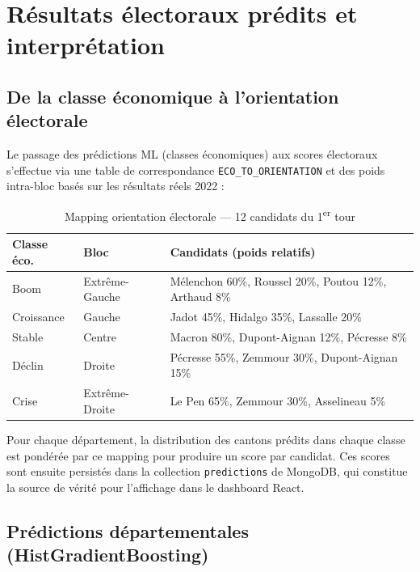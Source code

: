 \chapter{Résultats électoraux prédits et interprétation}
\label{ch:resultats}

\section{De la classe économique à l'orientation électorale}

Le passage des prédictions ML (classes économiques) aux scores électoraux s'effectue
via une table de correspondance \texttt{ECO\_TO\_ORIENTATION} et des poids intra-bloc
basés sur les résultats réels 2022 :

\begin{table}[H]
\centering
\caption{Mapping orientation électorale — 12 candidats du 1\textsuperscript{er} tour}
\label{tab:mapping}
\begin{tabular}{llp{7cm}}
\toprule
\textbf{Classe éco.} & \textbf{Bloc} & \textbf{Candidats (poids relatifs)} \\
\midrule
Boom       & Extrême-Gauche & Mélenchon 60\%, Roussel 20\%, Poutou 12\%, Arthaud 8\% \\
Croissance & Gauche         & Jadot 45\%, Hidalgo 35\%, Lassalle 20\% \\
Stable     & Centre         & Macron 80\%, Dupont-Aignan 12\%, Pécresse 8\% \\
Déclin     & Droite         & Pécresse 55\%, Zemmour 30\%, Dupont-Aignan 15\% \\
Crise      & Extrême-Droite & Le Pen 65\%, Zemmour 30\%, Asselineau 5\% \\
\bottomrule
\end{tabular}
\end{table}

\noindent Pour chaque département, la distribution des cantons prédits dans chaque classe
est pondérée par ce mapping pour produire un score par candidat.
Ces scores sont ensuite persistés dans la collection \texttt{predictions} de MongoDB,
qui constitue la source de vérité pour l'affichage dans le dashboard React.

\section{Prédictions départementales (HistGradientBoosting)}

